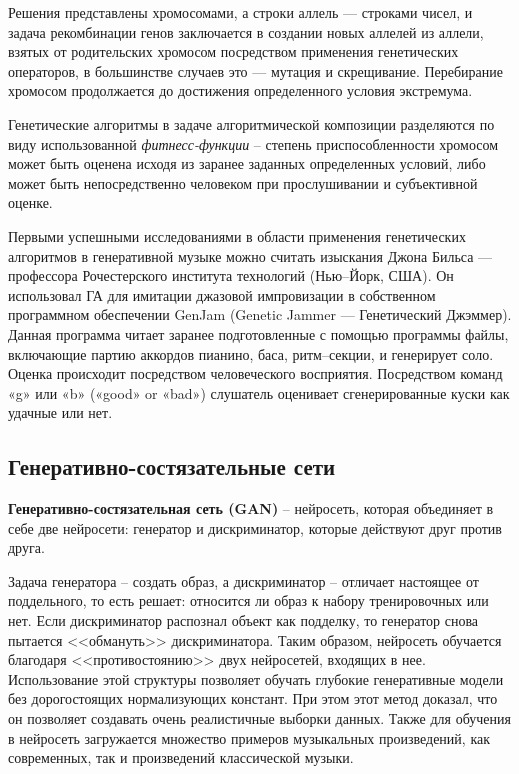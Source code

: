 Решения представлены хромосомами, а строки аллель — строками чисел, и задача рекомбинации генов заключается в создании новых аллелей из аллели, взятых от родительских хромосом посредством применения генетических операторов, в большинстве случаев это — мутация и скрещивание. Перебирание хромосом продолжается до достижения определенного условия экстремума. 

Генетические алгоритмы в задаче алгоритмической композиции разделяются по виду использованной \textit{фитнесс-функции} -- степень приспособленности хромосом может быть оценена исходя из заранее заданных определенных условий, либо может быть непосредственно человеком при прослушивании и субъективной оценке.

Первыми успешными исследованиями в области применения генетических алгоритмов в генеративной музыке можно считать изыскания Джона Бильса — профессора Рочестерского института технологий (Нью–Йорк, США). Он использовал ГА для имитации джазовой импровизации в собственном программном обеспечении GenJam \cite{gen-alg} (Genetic Jammer — Генетический Джэммер). Данная программа читает заранее подготовленные с помощью программы файлы, включающие партию аккордов пианино, баса, ритм–секции, и генерирует соло. Оценка происходит посредством человеческого восприятия. Посредством команд «g» или «b» («good» or «bad») слушатель оценивает сгенерированные куски как удачные или нет.


\subsection{Генеративно-состязательные сети}

\textbf{Генеративно-состязательная сеть (GAN)} \cite{gan} -- нейросеть, которая объединяет в себе две нейросети: генератор и дискриминатор, которые действуют друг против друга.

Задача генератора -- создать образ, а дискриминатор -- отличает настоящее от поддельного, то есть решает: относится ли образ к набору тренировочных или нет. Если дискриминатор распознал объект как подделку, то генератор снова пытается <<обмануть>> дискриминатора. Таким образом, нейросеть обучается благодаря <<противостоянию>> двух нейросетей, входящих в нее. Использование этой структуры позволяет обучать глубокие генеративные модели без дорогостоящих нормализующих констант. При этом этот метод доказал, что он позволяет создавать очень реалистичные выборки данных. Также для обучения в нейросеть загружается множество примеров музыкальных произведений, как современных, так и произведений классической музыки.


